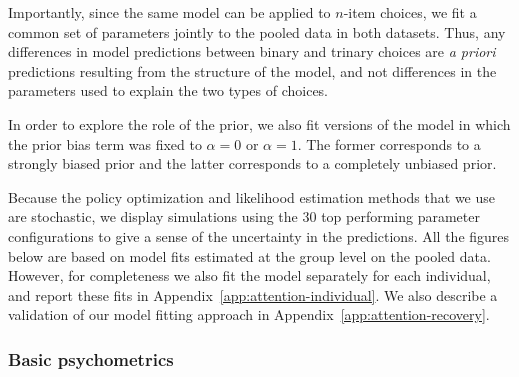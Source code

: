 Importantly, since the same model can be applied to $n$-item choices, we fit a common set of parameters jointly to the pooled data in both datasets. Thus, any differences in model predictions between binary and trinary choices are \emph{a priori} predictions resulting from the structure of the model, and not differences in the parameters used to explain the two types of choices. 

In order to explore the role of the prior, we also fit versions of the model in which the prior bias term was fixed to $\alpha = 0$ or $\alpha = 1$. The former corresponds to a strongly biased prior and the latter corresponds to a completely unbiased prior. 

Because the policy optimization and likelihood estimation methods that we use are stochastic, we display simulations using the 30 top performing parameter configurations to give a sense of the uncertainty in the predictions. All the figures below are based on model fits estimated at the group level on the pooled data. However, for completeness we also fit the model separately for each individual, and report these fits in Appendix~\ref{app:attention-individual}. We also describe a validation of our model fitting approach in Appendix~\ref{app:attention-recovery}.


\subsubsection{Basic psychometrics}


